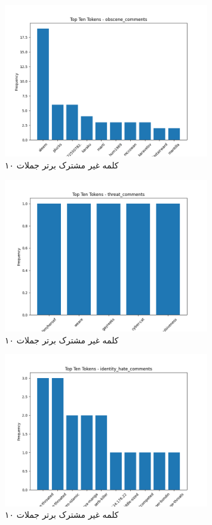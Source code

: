 \begin{figure}
  \centering
  \includegraphics[width=0.8\textwidth]{stats/top_ten_tokens_obscene_comments.png}
  \caption{۱۰ کلمه غیر مشترک برتر جملات }
  \label{fig:unique_common_words_total}
\end{figure}

\begin{figure}
  \centering
  \includegraphics[width=0.8\textwidth]{stats/top_ten_tokens_threat_comments.png}
  \caption{۱۰ کلمه غیر مشترک برتر جملات }
  \label{fig:unique_uncommon_words_count}
\end{figure}

\begin{figure}
  \centering
  \includegraphics[width=0.8\textwidth]{stats/top_ten_tokens_identity_hate_comments.png}
  \caption{۱۰ کلمه غیر مشترک برتر جملات }
  \label{fig:unique_uncommon_words_count}
\end{figure}

